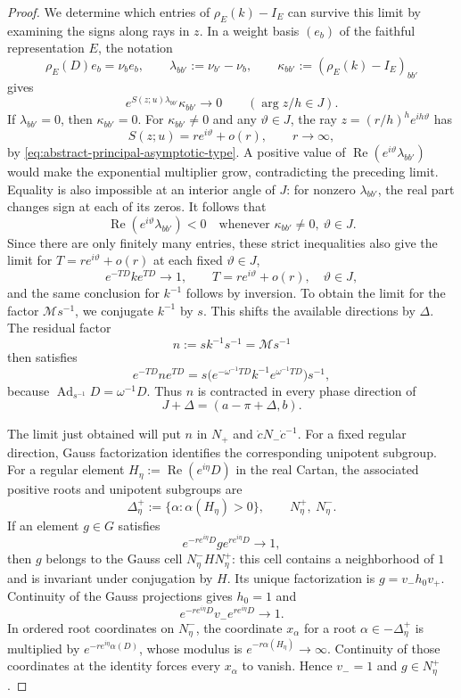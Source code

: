 \documentclass[11pt,leqno]{amsart}
\numberwithin{equation}{section}
\theoremstyle{plain}
\theoremstyle{definition}
\theoremstyle{plain}
\theoremstyle{definition}
\theoremstyle{remark}
\begin{document}
\begin{proof}
We determine which entries of $\rho_E(k)-I_E$ can survive this limit by examining the signs along rays in $z$.  In a weight basis $(e_b)$ of the faithful representation $E$, the notation
\[
 \rho_E(D)e_b=\nu_be_b,\qquad
 \lambda_{bb'}:=\nu_{b'}-\nu_b,\qquad
 \kappa_{bb'}:=(\rho_E(k)-I_E)_{bb'}
\]
gives
\[
 e^{S(z;u)\lambda_{bb'}}\kappa_{bb'}\longrightarrow0
 \qquad(\arg z/h\in J).
\]
If $\lambda_{bb'}=0$, then $\kappa_{bb'}=0$.  For $\kappa_{bb'}\ne0$ and any $\vartheta\in J$, the ray $z=(r/h)^he^{ih\vartheta}$ has
\[
 S(z;u)=re^{i\vartheta}+o(r),\qquad r\to\infty,
\]
by \eqref{eq:abstract-principal-asymptotic-type}.  A positive value of $\operatorname{Re}(e^{i\vartheta}\lambda_{bb'})$ would make the exponential multiplier grow, contradicting the preceding limit.  Equality is also impossible at an interior angle of $J$: for nonzero $\lambda_{bb'}$, the real part changes sign at each of its zeros.  It follows that
\[
 \operatorname{Re}(e^{i\vartheta}\lambda_{bb'})<0
 \quad\text{whenever }\kappa_{bb'}\ne0,\ \vartheta\in J.
\]
Since there are only finitely many entries, these strict inequalities also give the limit for $T=re^{i\vartheta}+o(r)$ at each fixed $\vartheta\in J$,
\[
 e^{-TD}ke^{TD}\longrightarrow1,
 \qquad T=re^{i\vartheta}+o(r),\quad\vartheta\in J,
\]
and the same conclusion for $k^{-1}$ follows by inversion.  To obtain the limit for the factor $\mathscr M s^{-1}$, we conjugate $k^{-1}$ by $s$.  This shifts the available directions by $\Delta$.  The residual factor
\[
 n:=sk^{-1}s^{-1}=\mathscr M s^{-1}
\]
then satisfies
\[
 e^{-TD}ne^{TD}
 =s\bigl(e^{-\omega^{-1}TD}k^{-1}e^{\omega^{-1}TD}\bigr)s^{-1},
\]
because $\operatorname{Ad}_{s^{-1}}D=\omega^{-1}D$.  Thus $n$ is contracted in every phase direction of
\[
 J+\Delta=(a-\pi+\Delta,b).
\]

The limit just obtained will put $n$ in $N_+$ and $\dot cN_-\dot c^{-1}$.  For a fixed regular direction, Gauss factorization identifies the corresponding unipotent subgroup.  For a regular element $H_\eta:=\operatorname{Re}(e^{i\eta}D)$ in the real Cartan, the associated positive roots and unipotent subgroups are
\[
 \Delta_\eta^+:=\{\alpha:\alpha(H_\eta)>0\},
 \qquad N_\eta^+,\ N_\eta^-.
\]
If an element $g\in G$ satisfies
\[
 e^{-re^{i\eta}D}g e^{re^{i\eta}D}\longrightarrow1,
\]
then $g$ belongs to the Gauss cell $N_\eta^-HN_\eta^+$: this cell contains a neighborhood of $1$ and is invariant under conjugation by $H$.  Its unique factorization is $g=v_-h_0v_+$.  Continuity of the Gauss projections gives $h_0=1$ and
\[
 e^{-re^{i\eta}D}v_-e^{re^{i\eta}D}\longrightarrow1.
\]
In ordered root coordinates on $N_\eta^-$, the coordinate $x_\alpha$ for a root $\alpha\in-\Delta_\eta^+$ is multiplied by $e^{-re^{i\eta}\alpha(D)}$, whose modulus is $e^{-r\alpha(H_\eta)}\to\infty$.  Continuity of those coordinates at the identity forces every $x_\alpha$ to vanish.  Hence $v_-=1$ and $g\in N_\eta^+$.


\end{proof}
\end{document}
